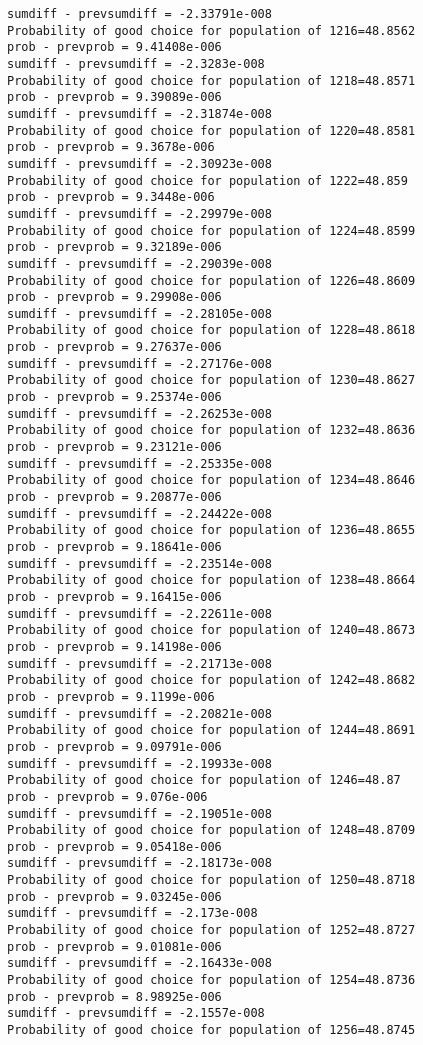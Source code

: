 \documentclass[11pt,onecolumn]{article}
\begin{document}
\begin{verbatim}
sumdiff - prevsumdiff = -2.33791e-008
Probability of good choice for population of 1216=48.8562
prob - prevprob = 9.41408e-006
sumdiff - prevsumdiff = -2.3283e-008
Probability of good choice for population of 1218=48.8571
prob - prevprob = 9.39089e-006
sumdiff - prevsumdiff = -2.31874e-008
Probability of good choice for population of 1220=48.8581
prob - prevprob = 9.3678e-006
sumdiff - prevsumdiff = -2.30923e-008
Probability of good choice for population of 1222=48.859
prob - prevprob = 9.3448e-006
sumdiff - prevsumdiff = -2.29979e-008
Probability of good choice for population of 1224=48.8599
prob - prevprob = 9.32189e-006
sumdiff - prevsumdiff = -2.29039e-008
Probability of good choice for population of 1226=48.8609
prob - prevprob = 9.29908e-006
sumdiff - prevsumdiff = -2.28105e-008
Probability of good choice for population of 1228=48.8618
prob - prevprob = 9.27637e-006
sumdiff - prevsumdiff = -2.27176e-008
Probability of good choice for population of 1230=48.8627
prob - prevprob = 9.25374e-006
sumdiff - prevsumdiff = -2.26253e-008
Probability of good choice for population of 1232=48.8636
prob - prevprob = 9.23121e-006
sumdiff - prevsumdiff = -2.25335e-008
Probability of good choice for population of 1234=48.8646
prob - prevprob = 9.20877e-006
sumdiff - prevsumdiff = -2.24422e-008
Probability of good choice for population of 1236=48.8655
prob - prevprob = 9.18641e-006
sumdiff - prevsumdiff = -2.23514e-008
Probability of good choice for population of 1238=48.8664
prob - prevprob = 9.16415e-006
sumdiff - prevsumdiff = -2.22611e-008
Probability of good choice for population of 1240=48.8673
prob - prevprob = 9.14198e-006
sumdiff - prevsumdiff = -2.21713e-008
Probability of good choice for population of 1242=48.8682
prob - prevprob = 9.1199e-006
sumdiff - prevsumdiff = -2.20821e-008
Probability of good choice for population of 1244=48.8691
prob - prevprob = 9.09791e-006
sumdiff - prevsumdiff = -2.19933e-008
Probability of good choice for population of 1246=48.87
prob - prevprob = 9.076e-006
sumdiff - prevsumdiff = -2.19051e-008
Probability of good choice for population of 1248=48.8709
prob - prevprob = 9.05418e-006
sumdiff - prevsumdiff = -2.18173e-008
Probability of good choice for population of 1250=48.8718
prob - prevprob = 9.03245e-006
sumdiff - prevsumdiff = -2.173e-008
Probability of good choice for population of 1252=48.8727
prob - prevprob = 9.01081e-006
sumdiff - prevsumdiff = -2.16433e-008
Probability of good choice for population of 1254=48.8736
prob - prevprob = 8.98925e-006
sumdiff - prevsumdiff = -2.1557e-008
Probability of good choice for population of 1256=48.8745

\end{verbatim}
\end{document}
